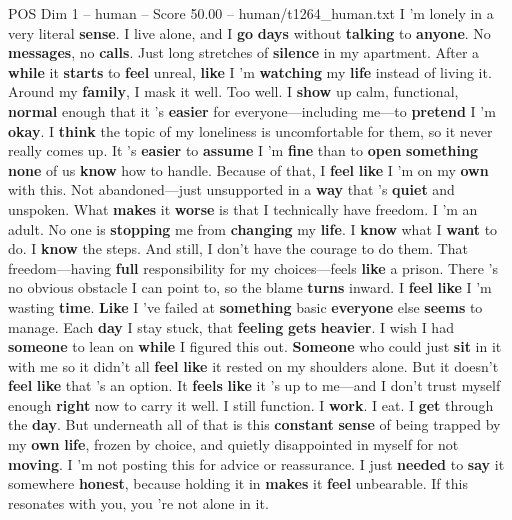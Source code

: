 \begin{textsample}{POS Dim 1 – human – Score 50.00 – human/t1264\_human.txt}  \label{ex:f1_pos_033}
I ’m lonely in a very literal \textbf{sense}.
I live alone, and I \textbf{go} \textbf{days} without \textbf{talking} to \textbf{anyone}.
No \textbf{messages}, no \textbf{calls}.
Just long stretches of \textbf{silence} in my apartment.
After a \textbf{while} it \textbf{starts} to \textbf{feel} unreal, \textbf{like} I ’m \textbf{watching} my \textbf{life} instead of living it.
Around my \textbf{family}, I mask it well.
Too well.
I \textbf{show} up calm, functional, \textbf{normal} enough that it ’s \textbf{easier} for everyone—including me—to \textbf{pretend} I ’m \textbf{okay}.
I \textbf{think} the topic of my loneliness is uncomfortable for them, so it never really comes up.
It ’s \textbf{easier} to \textbf{assume} I ’m \textbf{fine} than to \textbf{open} \textbf{something} \textbf{none} of us \textbf{know} how to handle.
Because of that, I \textbf{feel} \textbf{like} I ’m on my \textbf{own} with this.
Not abandoned—just unsupported in a \textbf{way} that ’s \textbf{quiet} and unspoken.
What \textbf{makes} it \textbf{worse} is that I technically have freedom.
I ’m an adult.
No one is \textbf{stopping} me from \textbf{changing} my \textbf{life}.
I \textbf{know} what I \textbf{want} to do.
I \textbf{know} the steps.
And still, I don't have the courage to do them.
That freedom—having \textbf{full} responsibility for my choices—feels \textbf{like} a prison.
There ’s no obvious obstacle I can point to, so the blame \textbf{turns} inward.
I \textbf{feel} \textbf{like} I ’m wasting \textbf{time}. \textbf{Like} I ’ve failed at \textbf{something} basic \textbf{everyone} else \textbf{seems} to manage.
Each \textbf{day} I stay stuck, that \textbf{feeling} \textbf{gets} \textbf{heavier}.
I wish I had \textbf{someone} to lean on \textbf{while} I figured this out. \textbf{Someone} who could just \textbf{sit} in it with me so it didn't all \textbf{feel} \textbf{like} it rested on my shoulders alone.
But it doesn't \textbf{feel} \textbf{like} that ’s an option.
It \textbf{feels} \textbf{like} it ’s up to me—and I don't trust myself enough \textbf{right} now to carry it well.
I still function.
I \textbf{work}.
I eat.
I \textbf{get} through the \textbf{day}.
But underneath all of that is this \textbf{constant} \textbf{sense} of being trapped by my \textbf{own} \textbf{life}, frozen by choice, and quietly disappointed in myself for not \textbf{moving}.
I ’m not posting this for advice or reassurance.
I just \textbf{needed} to \textbf{say} it somewhere \textbf{honest}, because holding it in \textbf{makes} it \textbf{feel} unbearable.
If this resonates with you, you ’re not alone in it.

\end{textsample}
